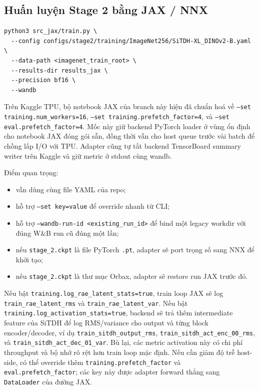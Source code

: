 \subsection{Huấn luyện Stage 2 bằng JAX / NNX}

\begin{lstlisting}[style=rae]
python3 src_jax/train.py \
  --config configs/stage2/training/ImageNet256/SiTDH-XL_DINOv2-B.yaml \
  --data-path <imagenet_train_root> \
  --results-dir results_jax \
  --precision bf16 \
  --wandb
\end{lstlisting}

Trên Kaggle TPU, bộ notebook JAX của branch này hiện đã chuẩn hoá về
\texttt{--set training.num\_workers=16},
\texttt{--set training.prefetch\_factor=4}, và
\texttt{--set eval.prefetch\_factor=4}. Mốc này giữ backend PyTorch loader ở
vùng ổn định cho notebook JAX đóng gói sẵn, đồng thời vẫn cho host queue trước
vài batch để chồng lấp I/O với TPU. Adapter cũng tự tắt backend TensorBoard
summary writer trên Kaggle và giữ metric ở stdout cùng wandb.

Điểm quan trọng:

\begin{itemize}[leftmargin=1.5em]
  \item vẫn dùng cùng file YAML của repo;
  \item hỗ trợ \texttt{--set key=value} để override nhanh từ CLI;
  \item hỗ trợ \texttt{--wandb-run-id <existing\_run\_id>} để bind một
  legacy workdir với đúng W\&B run cũ đúng một lần;
  \item nếu \texttt{stage\_2.ckpt} là file PyTorch \texttt{.pt}, adapter sẽ port
  trọng số sang NNX để khởi tạo;
  \item nếu \texttt{stage\_2.ckpt} là thư mục Orbax, adapter sẽ restore run JAX
  trước đó.
\end{itemize}

Nếu bật \texttt{training.log\_rae\_latent\_stats=true}, train loop JAX sẽ log
\texttt{train\_rae\_latent\_rms} và \texttt{train\_rae\_latent\_var}. Nếu bật
\texttt{training.log\_activation\_stats=true}, backend sẽ trả thêm intermediate
feature của SiTDH để log RMS/variance cho output và từng block encoder/decoder,
ví dụ \texttt{train\_sitdh\_output\_rms},
\texttt{train\_sitdh\_act\_enc\_00\_rms}, và
\texttt{train\_sitdh\_act\_dec\_01\_var}. Bù lại, các metric activation này có
chi phí throughput và bộ nhớ rõ rệt hơn train loop mặc định.
Nếu cần giảm độ trễ host-side, có thể override thêm
\texttt{training.prefetch\_factor} và \texttt{eval.prefetch\_factor}; các key
này được adapter forward thẳng sang \texttt{DataLoader} của đường JAX.

